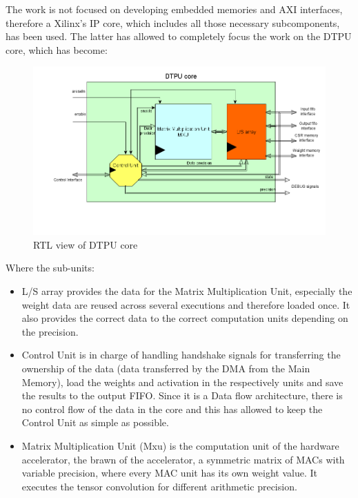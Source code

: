 The work is not focused on developing embedded memories and AXI interfaces, therefore a Xilinx's IP core, which includes all those necessary subcomponents, has been used.
The latter has allowed to completely focus the work on the DTPU core, which has become:
\begin{figure}[H]
\centering
\captionsetup{justification=centering}
\includegraphics[scale=0.45,angle=0]{./figure/dtpu_core.png}
\caption{RTL view of DTPU core}
\label{fig:dtpucore}
\end{figure}
Where the sub-units:
\begin{itemize}
\item L/S array provides the data for the Matrix Multiplication Unit, especially the weight data are reused across several executions and therefore loaded once. It also provides the correct data to the correct computation units depending on the precision.
\item Control Unit is in charge of handling handshake signals for transferring the ownership of the data (data transferred by the DMA from the Main Memory), load the weights and activation in the respectively units and save the results to the output FIFO. Since it is a Data flow architecture, there is no control flow of the data in the core and this has allowed to keep the Control Unit as simple as possible.
\item Matrix Multiplication Unit (Mxu) is the computation unit of the hardware accelerator, the brawn of the accelerator, a symmetric matrix of MACs with variable precision, where every MAC unit has its own weight value. It executes the tensor convolution for different arithmetic precision.
\end{itemize}